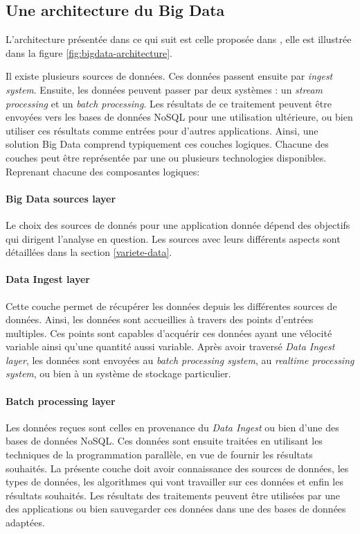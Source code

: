 		\subsection{Une architecture du Big Data}
		
		L'architecture présentée dans ce qui suit est celle proposée dans  \cite{anil-big-data}, elle est illustrée dans la figure \ref{fig:bigdata-architecture}.
		
		Il existe plusieurs sources de données. Ces données  passent ensuite par \textit{ingest system}. Ensuite, les données peuvent passer par deux systèmes : un \textit{stream processing } et un \textit{batch processing}.  Les résultats de ce traitement peuvent être envoyées vers les bases de données NoSQL pour une utilisation ultérieure, ou bien  utiliser ces résultats comme entrées pour d'autres applications. Ainsi, une solution Big Data comprend typiquement  ces  couches logiques. Chacune des couches peut être représentée par une ou plusieurs technologies disponibles. Reprenant chacune des composantes logiques:
		
		
		
		\paragraph{Big Data sources layer} Le choix des sources de donnés pour une application donnée dépend des objectifs qui dirigent l'analyse en question. Les sources avec leurs différents aspects sont détaillées dans la section \ref{variete-data}.
		
		\paragraph{Data Ingest layer} Cette couche permet de récupérer les données depuis les différentes sources de données. Ainsi, les données sont accueillies à travers des points d'entrées multiples. Ces points  sont capables d'acquérir ces données ayant une vélocité variable ainsi qu'une quantité aussi variable.  Après avoir traversé  \textit{Data Ingest layer}, les données sont envoyées au \textit{batch processing system}, au \textit{realtime processing system}, ou bien à un système de stockage particulier.
		
		\paragraph{Batch processing layer} Les données reçues sont celles en provenance du \textit{Data Ingest} ou bien d'une des bases de données NoSQL. Ces données sont ensuite traitées en utilisant les techniques de la programmation parallèle, en vue de fournir les résultats souhaités. La présente couche doit avoir connaissance des sources de données, les types de données, les algorithmes qui vont travailler sur ces données et enfin les résultats souhaités. Les résultats des traitements peuvent être utilisées par une des applications ou bien sauvegarder ces données dans une des bases de données adaptées.
		
